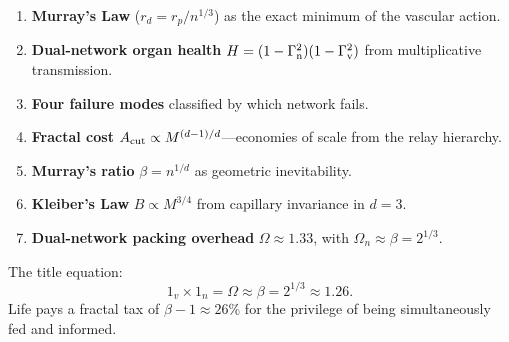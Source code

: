 \documentclass[aps,pre,twocolumn,superscriptaddress,floatfix]{revtex4-2}
\begin{document}
\begin{enumerate}
  \item \textbf{Murray's Law} ($r_d = r_p/n^{1/3}$) as
    the exact minimum of the vascular action.
  \item \textbf{Dual-network organ health}
    $H = (1-\Gamma_{\text{n}}^2)(1-\Gamma_{\text{v}}^2)$ from multiplicative
    transmission.
  \item \textbf{Four failure modes} classified by which
    network fails.
  \item \textbf{Fractal cost}
    $A_{\text{cut}} \propto M^{(d-1)/d}$---economies of scale
    from the relay hierarchy.
  \item \textbf{Murray's ratio} $\beta = n^{1/d}$ as
    geometric inevitability.
  \item \textbf{Kleiber's Law} $B \propto M^{3/4}$ from
    capillary invariance in $d=3$.
  \item \textbf{Dual-network packing overhead}
    $\Omega \approx 1.33$, with
    $\Omega_n \approx \beta = 2^{1/3}$.

\end{enumerate}

\noindent
The title equation:
\begin{equation}
  1_v \times 1_n = \Omega \approx \beta
  = 2^{1/3} \approx 1.26.
  \label{eq:omega-beta}
\end{equation}
Life pays a fractal tax of $\beta - 1 \approx 26\%$ for
the privilege of being simultaneously fed and informed.
\end{document}
